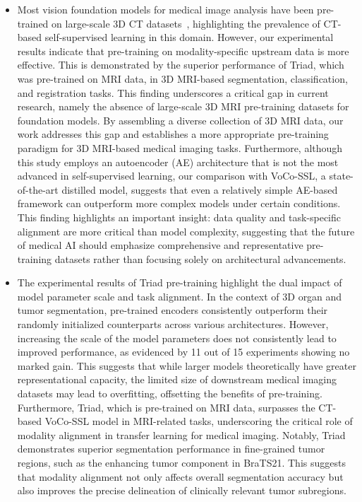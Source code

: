 \begin{itemize}

\item Most vision foundation models for medical image analysis have been pre-trained on large-scale 3D CT datasets~\citep{tang2022self,ye2024continual,zhuang2024mim,jiang2023anatomical}, highlighting the prevalence of CT-based self-supervised learning in this domain.
However, our experimental results indicate that pre-training on modality-specific upstream data is more effective. This is demonstrated by the superior performance of Triad, which was pre-trained on MRI data, in 3D MRI-based segmentation, classification, and registration tasks.
This finding underscores a critical gap in current research, namely the absence of large-scale 3D MRI pre-training datasets for foundation models.
By assembling a diverse collection of 3D MRI data, our work addresses this gap and establishes a more appropriate pre-training paradigm for 3D MRI-based medical imaging tasks.
Furthermore, although this study employs an autoencoder (AE) architecture that is not the most advanced in self-supervised learning, our comparison with VoCo-SSL, a state-of-the-art distilled model, suggests that even a relatively simple AE-based framework can outperform more complex models under certain conditions.
This finding highlights an important insight: data quality and task-specific alignment are more critical than model complexity, suggesting that the future of medical AI should emphasize comprehensive and representative pre-training datasets rather than focusing solely on architectural advancements.

\item The experimental results of Triad pre-training highlight the dual impact of model parameter scale and task alignment.
In the context of 3D organ and tumor segmentation, pre-trained encoders consistently outperform their randomly initialized counterparts across various architectures.
However, increasing the scale of the model parameters does not consistently lead to improved performance, as evidenced by 11 out of 15 experiments showing no marked gain.
This suggests that while larger models theoretically have greater representational capacity, the limited size of downstream medical imaging datasets may lead to overfitting, offsetting the benefits of pre-training.
Furthermore, Triad, which is pre-trained on MRI data, surpasses the CT-based VoCo-SSL model in MRI-related tasks, underscoring the critical role of modality alignment in transfer learning for medical imaging.
Notably, Triad demonstrates superior segmentation performance in fine-grained tumor regions, such as the enhancing tumor component in BraTS21. This suggests that modality alignment not only affects overall segmentation accuracy but also improves the precise delineation of clinically relevant tumor subregions.


\end{itemize}
